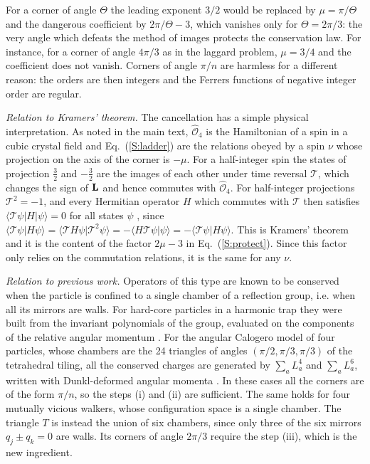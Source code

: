 For a corner of angle $\Theta$ the leading exponent $3/2$ would be replaced by $\mu = \pi/\Theta$ and the dangerous coefficient by $2 \pi/\Theta - 3$, which vanishes only for $\Theta = 2\pi/3$: the very angle which defeats the method of images protects the conservation law. For instance, for a corner of angle $4\pi/3$ as in the laggard problem, $\mu = 3/4$ and the coefficient does not vanish. Corners of angle $\pi/n$ are harmless for a different reason: the orders are then integers and the Ferrers functions of negative integer order are regular.

\emph{Relation to Kramers' theorem.} The cancellation has a simple physical interpretation. As noted in the main text, $\hat{\mathcal{O}}_4$ is the Hamiltonian of a spin in a cubic crystal field \cite{LLW62,AB70} and Eq.~(\ref{S:ladder}) are the relations obeyed by a spin $\nu$ whose projection on the axis of the corner is $-\mu$. For a half-integer spin the states of projection $\frac{3}{2}$ and $-\frac{3}{2}$ are the images of each other under time reversal $\mathcal{T}$, which changes the sign of $\vb{L}$ and hence commutes with $\hat{\mathcal{O}}_4$. For half-integer projections $\mathcal{T}^2 = -1$, and every Hermitian operator $H$ which commutes with $\mathcal{T}$ then satisfies $\langle \mathcal{T} \psi | H | \psi \rangle = 0$ for all states $\psi$ \cite{AB70}, since $\langle \mathcal{T} \psi | H \psi \rangle = \langle \mathcal{T} H \psi | \mathcal{T}^2 \psi \rangle = - \langle H \mathcal{T} \psi | \psi \rangle = - \langle \mathcal{T} \psi | H \psi \rangle$. This is Kramers' theorem and it is the content of the factor $2 \mu - 3$ in Eq.~(\ref{S:protect}). Since this factor only relies on the commutation relations, it is the same for any $\nu$.

\emph{Relation to previous work.} Operators of this type are known to be conserved when the particle is confined to a single chamber of a reflection group, i.e. when all its mirrors are walls. For hard-core particles in a harmonic trap they were built from the invariant polynomials of the group, evaluated on the components of the relative angular momentum \cite{HODVJZ17}. For the angular Calogero model of four particles, whose chambers are the 24 triangles of angles $(\pi/2, \pi/3, \pi/3)$ of the tetrahedral tiling, all the conserved charges are generated by $\sum_a L_a^4$ and $\sum_a L_a^6$, written with Dunkl-deformed angular momenta \cite{CL15}. In these cases all the corners are of the form $\pi/n$, so the steps (i) and (ii) are sufficient. The same holds for four mutually vicious walkers, whose configuration space is a single chamber. The triangle $T$ is instead the union of six chambers, since only three of the six mirrors $q_j \pm q_k = 0$ are walls. Its corners of angle $2\pi/3$ require the step (iii), which is the new ingredient.


